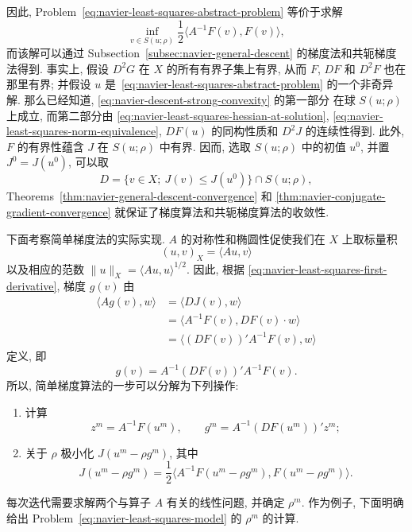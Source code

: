 因此, Problem~\eqref{eq:navier-least-squares-abstract-problem} 等价于求解
\begin{equation}
\label{eq:navier-least-squares-minimization}
\inf_{v\in S(u;\rho)}\frac12\langle A^{-1}F(v),F(v)\rangle,
\end{equation}
而该解可以通过 Subsection~\ref{subsec:navier-general-descent} 的梯度法和共轭梯度法得到.
事实上, 假设 $D^2G$ 在 $X$ 的所有有界子集上有界, 从而 $F$, $DF$ 和 $D^2F$
也在那里有界; 并假设 $u$ 是 \,\eqref{eq:navier-least-squares-abstract-problem}
的一个非奇异解. 那么已经知道, \eqref{eq:navier-descent-strong-convexity} 的第一部分
在球 $S(u;\rho)$ 上成立, 而第二部分由
\eqref{eq:navier-least-squares-hessian-at-solution},
\eqref{eq:navier-least-squares-norm-equivalence}, $DF(u)$ 的同构性质和 $D^2J$
的连续性得到. 此外, $F$ 的有界性蕴含 $J$ 在 $S(u;\rho)$ 中有界. 因而,
选取 $S(u;\rho)$ 中的初值 $u^0$, 并置 $J^0=J(u^0)$, 可以取
\[
D=\{v\in X;\ J(v)\leq J(u^0)\}\cap S(u;\rho),
\]
Theorems~\ref{thm:navier-general-descent-convergence} 和
\ref{thm:navier-conjugate-gradient-convergence} 就保证了梯度算法和共轭梯度算法的收敛性.

下面考察简单梯度法的实际实现. $A$ 的对称性和椭圆性促使我们在 $X$ 上取标量积
\[
(u,v)_X=\langle Au,v\rangle
\]
以及相应的范数 $\|u\|_X=\langle Au,u\rangle^{1/2}$. 因此, 根据
\eqref{eq:navier-least-squares-first-derivative}, 梯度 $g(v)$ 由
\[
\begin{aligned}
\langle Ag(v),w\rangle
&=\langle DJ(v),w\rangle\\
&=\langle A^{-1}F(v),DF(v)\mathbin{\cdot}w\rangle\\
&=\langle(DF(v))'A^{-1}F(v),w\rangle
\end{aligned}
\]
定义, 即
\begin{equation}
\label{eq:navier-least-squares-gradient}
g(v)=A^{-1}(DF(v))'A^{-1}F(v).
\end{equation}
所以, 简单梯度算法的一步可以分解为下列操作:
\begin{enumerate}
\item[1$^\circ$)] 计算
\[
z^m=A^{-1}F(u^m),
\qquad
g^m=A^{-1}(DF(u^m))'z^m;
\]
\item[2$^\circ$)] 关于 $\rho$ 极小化 $J(u^m-\rho g^m)$, 其中
\[
J(u^m-\rho g^m)
=\frac12\langle A^{-1}F(u^m-\rho g^m),F(u^m-\rho g^m)\rangle.
\]
\end{enumerate}
每次迭代需要求解两个与算子 $A$ 有关的线性问题, 并确定 $\rho^m$. 作为例子,
下面明确给出 Problem~\eqref{eq:navier-least-squares-model} 的 $\rho^m$ 的计算.

